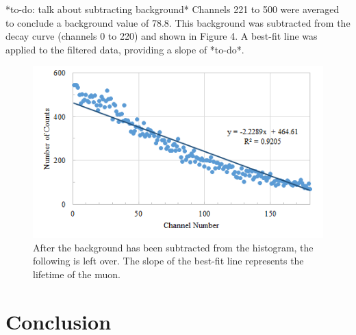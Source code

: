 \documentclass[%
 aip,
 amsmath,amssymb,
 reprint,%
floatfix,
]{revtex4-1}
\begin{document}
*to-do: talk about subtracting background*
Channels 221 to 500 were averaged to conclude a background value of 78.8. This background was subtracted from the decay curve (channels 0 to 220) and shown in Figure 4. A best-fit line was applied to the filtered data, providing a slope of *to-do*.

\begin{figure}[H]
	\centering
	\includegraphics[scale=0.8]{filtered.png}
	\caption{After the background has been subtracted from the histogram, the following is left over. The slope of the best-fit line represents the lifetime of the muon.}
\end{figure}

\section{\label{sec:level5}Conclusion}


\nocite{*}
\end{document}
